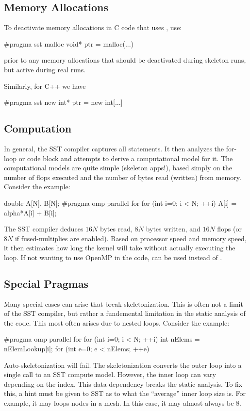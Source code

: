 \subsection{Memory Allocations}
To deactivate memory allocations in C code that uses , use:
\begin{CppCode}
#pragma sst malloc
  void* ptr = malloc(...)
\end{CppCode}
prior to any memory allocations that should be deactivated during skeleton runs, but active during real runs.

Similarly, for C++ we have
\begin{CppCode}
#pragma sst new
  int* ptr = new int[...]
\end{CppCode}

\subsection{Computation}
In general, the SST compiler captures all  statements.
It then analyzes the for-loop or code block and attempts to derive a computational model for it.
The computational models are quite simple (skeleton apps!), 
based simply on the number of flops executed and the number of bytes read (written) from memory.
Consider the example:

\begin{CppCode}
double A[N], B[N];
#pragma omp parallel for
for (int i=0; i < N; ++i){
  A[i] = alpha*A[i] + B[i];
}
\end{CppCode}
The SST compiler deduces $16N$ bytes read, $8N$ bytes written, and $16N$ flops (or $8N$ if fused-multiplies are enabled).
Based on processor speed and memory speed, it then estimates how long the kernel will take without actually executing the loop.
If not wanting to use OpenMP in the code,  can be used instead of .

\subsection{Special Pragmas}
Many special cases can arise that break skeletonization.
This is often not a limit of the SST compiler, but rather a fundemental limitation in the static analysis of the code.
This most often arises due to nested loops. Consider the example:

\begin{CppCode}
#pragma omp parallel for
for (int i=0; i < N; ++i){
  int nElems = nElemLookup[i];
  for (int e=0; e < nElems; ++e){
  }
}
\end{CppCode}
Auto-skeletonization will fail. The skeletonization converts the outer loop into a single call to an SST compute model.
However, the inner loop can vary depending on the index.
This data-dependency breaks the static analysis.
To fix this, a hint must be given to SST as to what the ``average'' inner loop size is.
For example, it may loops nodes in a mesh. In this case, it may almost always be 8.

